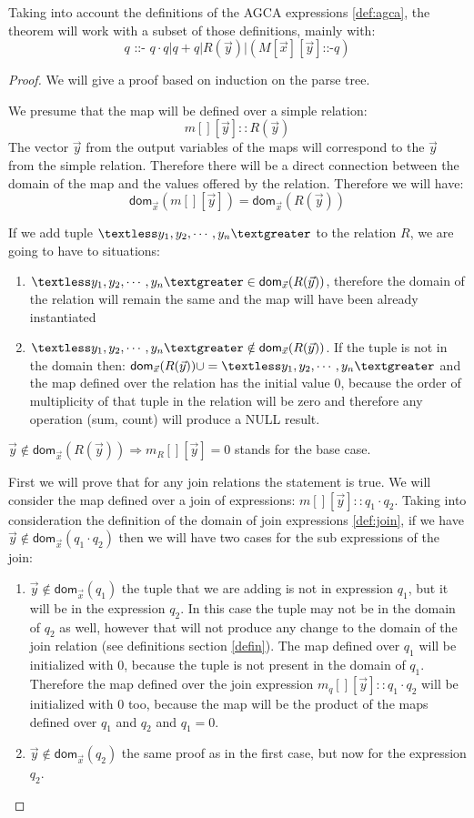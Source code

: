 \documentclass[12pt]{article}
\newcommand{\dom}{\textsf{dom}}
\begin{document}
Taking into account the definitions of the AGCA expressions \ref{def:agca}, the theorem will work with a subset of those definitions, mainly with:
$$q\text{ ::- }q\cdot q | q + q|R(\vec{y})|(M[\vec{x}][\vec{y}]\text{::-}q)$$

\begin{proof}
We will give a proof based on induction on the parse tree.

We presume that the map will be defined over a simple relation: $$m[][\vec{y}]::R(\vec{y})$$ The vector $\vec{y}$ from the output variables of the maps will correspond to the $\vec{y}$ from the simple relation. Therefore there will be a direct connection between the domain of the map and the values offered by the relation. Therefore we will have: 
$$\dom{}_{\vec{x}}(m[][\vec{y}])=\dom{}_{\vec{x}}(R(\vec{y}))$$ 

If we add tuple $\textless y_1,y_2,\cdots,y_n\textgreater$ to the relation $R$, we are going to have to situations:
\begin{enumerate}
\item $\textless y_1,y_2,\cdots,y_n\textgreater\in\dom{}_{\vec{x}}(R(\vec{y}))$, therefore the domain of the relation will remain the same and the map will have been already instantiated
\item $\textless y_1,y_2,\cdots,y_n\textgreater\notin\dom{}_{\vec{x}}(R(\vec{y}))$. If the tuple is not in the domain then: $\dom{}_{\vec x}(R(\vec y))\cup=\textless y_1,y_2,\cdots,y_n\textgreater$ and the map defined over the relation has the initial value 0, because the order of multiplicity of that tuple in the relation will be zero and therefore any operation (sum, count) will produce a NULL result.
\end{enumerate}

$\vec{y}\notin\dom{}_{\vec{x}}(R(\vec{y}))\Rightarrow m_R[][\vec{y}]=0$ stands for the base case.

First we will prove that for any join relations the statement is true. We will consider the map defined over a join of expressions: $m[][\vec{y}]::q_1\cdot q_2$. Taking into consideration the definition of the domain of join expressions \ref{def:join}, if we have $\vec{y}\notin\dom{}_{\vec{x}}(q_1\cdot q_2)$ then we will have two cases for the sub expressions of the join:
\begin{enumerate}
\item $\vec{y}\notin\dom{}_{\vec{x}}(q_1)$ the tuple that we are adding is not in expression $q_1$, but it will be in the expression $q_2$. In this case the tuple may not be in the domain of $q_2$ as well, however that will not produce any change to the domain of the join relation (see definitions section \ref{defin}). The map defined over $q_1$ will be initialized with 0, because the tuple is not present in the domain of $q_1$. Therefore the map defined over the join expression $m_q[][\vec{y}]:: q_1\cdot q_2$ will be initialized with 0 too, because the map will be the product of the maps defined over $q_1$ and $q_2$ and $q_1=0$. 
\item $\vec{y}\notin\dom{}_{\vec{x}}(q_2)$ the same proof as in the first case, but now for the expression $q_2$.
\end{enumerate}


\end{proof}
\end{document}
